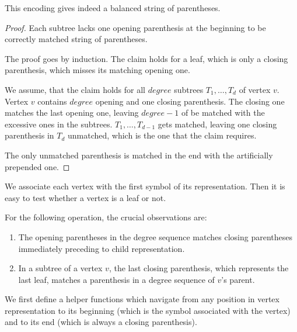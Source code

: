 \begin{lemma}
	This encoding gives indeed a balanced string of parentheses.
\end{lemma}
\begin{proof}
	Each subtree lacks one opening parenthesis at the beginning to be correctly matched string of parentheses.
	
	The proof goes by induction.
	The claim holds for a leaf, which is only a closing parenthesis, which misses its matching opening one.
	
	We assume, that the claim holds for all $degree$ subtrees $T_1, \ldots, T_d$ of vertex $v$.
	Vertex $v$ contains $degree$ opening and one closing parenthesis.
	The closing one matches the last opening one, leaving $degree - 1$ of be matched with the excessive ones in the subtrees.
	$T_1, \ldots, T_{d-1}$ gets matched, leaving one closing parenthesis in $T_d$ unmatched, which is the one that the claim requires.
	
	The only unmatched parenthesis is matched in the end with the artificially prepended one.
\end{proof}

We associate each vertex with the first symbol of its representation.
Then it is easy to test whether a vertex is a leaf or not.

\begin{algorithmic}
	\State {}
\EndFunction
\end{algorithmic}

\begin{algorithmic}
	\State {} 
\EndFunction
\end{algorithmic}

For the following operation, the crucial observations are:
\begin{enumerate}
	\item The opening parentheses in the degree sequence matches closing parentheses immediately preceding to child representation.
	\item In a subtree of a vertex $v$, the last closing parenthesis, which represents the last leaf, matches a parenthesis in a degree sequence of $v$'s parent.
\end{enumerate}

We first define a helper functions which navigate from any position in vertex representation to its beginning (which is the symbol associated with the vertex) and to its end (which is always a closing parenthesis).


